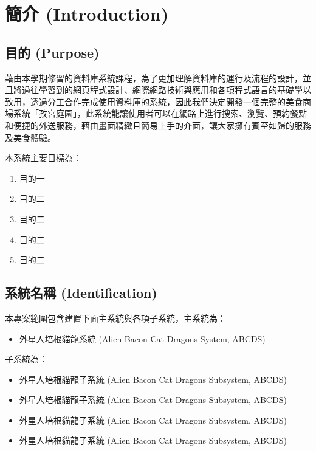 \documentclass[a4paper, 12pt]{article}
\begin{document}

\section{簡介 (Introduction)}

\subsection{目的 (Purpose)}

藉由本學期修習的資料庫系統課程，為了更加理解資料庫的運行及流程的設計，並且將過往學習到的網頁程式設計、網際網路技術與應用和各項程式語言的基礎學以致用，透過分工合作完成使用資料庫的系統，因此我們決定開發一個完整的美食商場系統「孜宮庭園\autocite{csie_restaurant}」，此系統能讓使用者可以在網路上進行搜索、瀏覽、預約餐點和便捷的外送服務，藉由畫面精緻且簡易上手的介面，讓大家擁有賓至如歸的服務及美食體驗。

\noindent 本系統主要目標為：
\begin{enumerate}
  \item 目的一
  \item 目的二
  \item 目的二
  \item 目的二
  \item 目的二
\end{enumerate}


\subsection{系統名稱 (Identification)}

\noindent 本專案範圍包含建置下面主系統與各項子系統，主系統為：

\begin{itemize}
  \item 外星人培根貓龍系統 (Alien Bacon Cat Dragons System, ABCDS)
\end{itemize}

\noindent 子系統為：

\begin{itemize}
  \item 外星人培根貓龍子系統 (Alien Bacon Cat Dragons Subsystem, ABCDS)
  \item 外星人培根貓龍子系統 (Alien Bacon Cat Dragons Subsystem, ABCDS)
  \item 外星人培根貓龍子系統 (Alien Bacon Cat Dragons Subsystem, ABCDS)
  \item 外星人培根貓龍子系統 (Alien Bacon Cat Dragons Subsystem, ABCDS)
\end{itemize}
\end{document}
